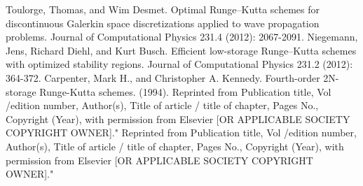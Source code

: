 \documentclass[letterpaper,12pt]{report}
\begin{document}
\begin{thebibliography}{9}
Toulorge, Thomas, and Wim Desmet. Optimal Runge–Kutta schemes for discontinuous Galerkin space discretizations applied to wave propagation problems. Journal of Computational Physics 231.4 (2012): 2067-2091.
Niegemann, Jens, Richard Diehl, and Kurt Busch. Efficient low-storage Runge–Kutta schemes with optimized stability regions. Journal of Computational Physics 231.2 (2012): 364-372.
Carpenter, Mark H., and Christopher A. Kennedy. Fourth-order 2N-storage Runge-Kutta schemes. (1994).
Reprinted from Publication title, Vol /edition number, Author(s), Title of article / title of chapter, Pages No., Copyright (Year), with permission from Elsevier [OR APPLICABLE SOCIETY COPYRIGHT OWNER]."
Reprinted from Publication title, Vol /edition number, Author(s), Title of article / title of chapter, Pages No., Copyright (Year), with permission from Elsevier [OR APPLICABLE SOCIETY COPYRIGHT OWNER]."


\end{thebibliography}
\end{document}
